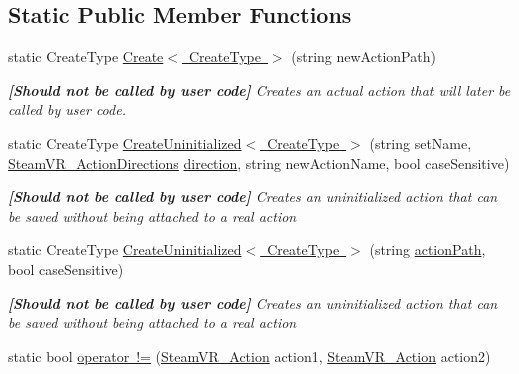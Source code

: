 \subsection*{Static Public Member Functions}
\begin{DoxyCompactItemize}
\item 
static Create\+Type \mbox{\hyperlink{class_valve_1_1_v_r_1_1_steam_v_r___action_a75746fdff4c10e89c9e43bd598a106f0}{Create$<$ Create\+Type $>$}} (string new\+Action\+Path)
\begin{DoxyCompactList}\small\item\em {\bfseries{\mbox{[}Should not be called by user code\mbox{]}}} Creates an actual action that will later be called by user code. \end{DoxyCompactList}\item 
static Create\+Type \mbox{\hyperlink{class_valve_1_1_v_r_1_1_steam_v_r___action_a22efd6a86141fef284c6de86ba31f75e}{Create\+Uninitialized$<$ Create\+Type $>$}} (string set\+Name, \mbox{\hyperlink{namespace_valve_1_1_v_r_a1e6192cb5ddaf204afab87ccb5728780}{Steam\+V\+R\+\_\+\+Action\+Directions}} \mbox{\hyperlink{class_valve_1_1_v_r_1_1_steam_v_r___action_aee8591fed8be32dde8c11ab75b830323}{direction}}, string new\+Action\+Name, bool case\+Sensitive)
\begin{DoxyCompactList}\small\item\em {\bfseries{\mbox{[}Should not be called by user code\mbox{]}}} Creates an uninitialized action that can be saved without being attached to a real action \end{DoxyCompactList}\item 
static Create\+Type \mbox{\hyperlink{class_valve_1_1_v_r_1_1_steam_v_r___action_ad9e9c7d4a4f472f28dfa9d787919384a}{Create\+Uninitialized$<$ Create\+Type $>$}} (string \mbox{\hyperlink{class_valve_1_1_v_r_1_1_steam_v_r___action_a75a8c6b9641982a47e32039b131e3eca}{action\+Path}}, bool case\+Sensitive)
\begin{DoxyCompactList}\small\item\em {\bfseries{\mbox{[}Should not be called by user code\mbox{]}}} Creates an uninitialized action that can be saved without being attached to a real action \end{DoxyCompactList}\item 
static bool \mbox{\hyperlink{class_valve_1_1_v_r_1_1_steam_v_r___action_ad7b81277f914a527971510f8c1b3f38d}{operator !=}} (\mbox{\hyperlink{class_valve_1_1_v_r_1_1_steam_v_r___action}{Steam\+V\+R\+\_\+\+Action}} action1, \mbox{\hyperlink{class_valve_1_1_v_r_1_1_steam_v_r___action}{Steam\+V\+R\+\_\+\+Action}} action2)

\end{DoxyCompactItemize}
